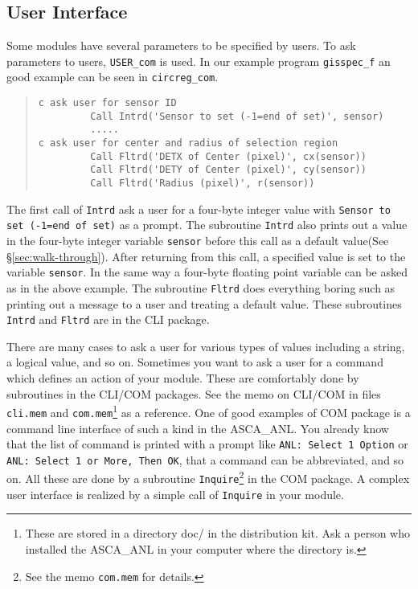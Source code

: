 \subsection{User Interface}
Some modules have several parameters to be specified by users.
To ask parameters to users,
{\tt USER\_com} is used.
In our example program {\tt gisspec\_f}
an good example can be seen in {\tt circreg\_com}.
\begin{quote}\baselineskip 3.2mm\begin{verbatim}
c ask user for sensor ID
         Call Intrd('Sensor to set (-1=end of set)', sensor)
         .....
c ask user for center and radius of selection region
         Call Fltrd('DETX of Center (pixel)', cx(sensor))
         Call Fltrd('DETY of Center (pixel)', cy(sensor))
         Call Fltrd('Radius (pixel)', r(sensor))
\end{verbatim}\end{quote}
The first call of {\tt Intrd} ask a user for a four-byte integer value
with {\tt Sensor to set (-1=end of set)} as a prompt.
The subroutine {\tt Intrd} also prints out 
a value in the four-byte integer variable {\tt sensor} before this call
as a default value(See \S \ref{sec:walk-through}).
After returning from this call,
a specified value is set to the variable {\tt sensor}.
In the same way
a four-byte floating point variable can be asked as in the above example.
The subroutine {\tt Fltrd} does everything boring
such as printing out a message to a user and treating a default value.
These subroutines {\tt Intrd} and {\tt Fltrd} are in the CLI package.

There are many cases to ask a user for various types of values
including a string, a logical value, and so on.
Sometimes
you want to ask a user for a command which defines an action of your module.
These are comfortably done by subroutines in the CLI/COM packages.
See the memo on CLI/COM in files {\tt cli.mem} and {\tt com.mem}\footnote{
These are stored in a directory doc/ in the distribution kit.
Ask a person who installed the ASCA\_ANL in your computer
where the directory is.
} as a reference.
One of good examples of COM package 
is a command line interface of such a kind in the ASCA\_ANL.
You already know
that the list of command is printed with a prompt
like {\tt ANL: Select  1 Option} or {\tt ANL: Select  1 or More, Then OK},
that a command can be abbreviated,
and so on.
All these are done by a subroutine {\tt Inquire}\footnote{
See the memo {\tt com.mem} for details.
} in the COM package.
A complex user interface is realized
by a simple call of {\tt Inquire} in your module.

